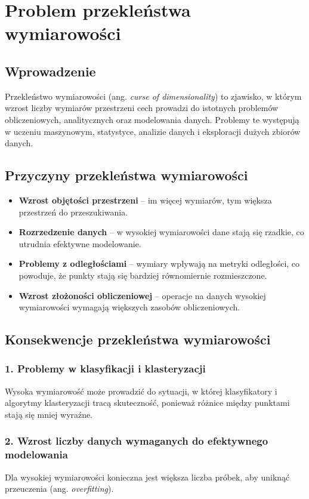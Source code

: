 \section{Problem przekleństwa wymiarowości}

\subsection{Wprowadzenie}
Przekleństwo wymiarowości (ang. \textit{curse of dimensionality}) to zjawisko, w którym wzrost liczby wymiarów przestrzeni cech prowadzi do istotnych problemów obliczeniowych, analitycznych oraz modelowania danych. Problemy te występują w uczeniu maszynowym, statystyce, analizie danych i eksploracji dużych zbiorów danych.

\subsection{Przyczyny przekleństwa wymiarowości}
\begin{itemize}
    \item \textbf{Wzrost objętości przestrzeni} – im więcej wymiarów, tym większa przestrzeń do przeszukiwania.
    \item \textbf{Rozrzedzenie danych} – w wysokiej wymiarowości dane stają się rzadkie, co utrudnia efektywne modelowanie.
    \item \textbf{Problemy z odległościami} – wymiary wpływają na metryki odległości, co powoduje, że punkty stają się bardziej równomiernie rozmieszczone.
    \item \textbf{Wzrost złożoności obliczeniowej} – operacje na danych wysokiej wymiarowości wymagają większych zasobów obliczeniowych.
\end{itemize}

\subsection{Konsekwencje przekleństwa wymiarowości}
\subsubsection{1. Problemy w klasyfikacji i klasteryzacji}
Wysoka wymiarowość może prowadzić do sytuacji, w której klasyfikatory i algorytmy klasteryzacji tracą skuteczność, ponieważ różnice między punktami stają się mniej wyraźne.

\subsubsection{2. Wzrost liczby danych wymaganych do efektywnego modelowania}
Dla wysokiej wymiarowości konieczna jest większa liczba próbek, aby uniknąć przeuczenia (ang. \textit{overfitting}).

